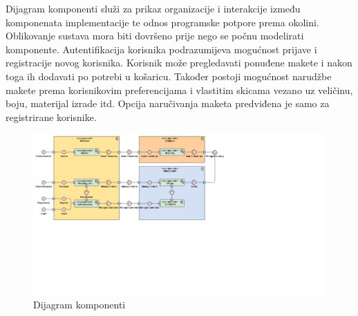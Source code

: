 			Dijagram komponenti služi za prikaz organizacije i interakcije između komponenata implementacije te odnos programske potpore prema okolini. Oblikovanje sustava mora biti dovršeno prije nego se počnu modelirati komponente. Autentifikacija korisnika podrazumijeva mogućnost prijave i registracije novog korisnika. Korisnik
može pregledavati ponuđene makete i nakon toga ih dodavati po potrebi u košaricu. Također postoji mogućnost narudžbe makete prema korisnikovim preferencijama i vlastitim skicama vezano uz veličinu, boju, materijal izrade itd. Opcija naručivanja maketa predviđena je samo za registrirane korisnike.
			
			\begin{figure}[H]
				\includegraphics[width=1\linewidth]{slike/dijagram_komponenti.PNG} %
				\caption{Dijagram komponenti}
				\label{fig:dijkomp} %
			\end{figure}
			
			
			\eject
